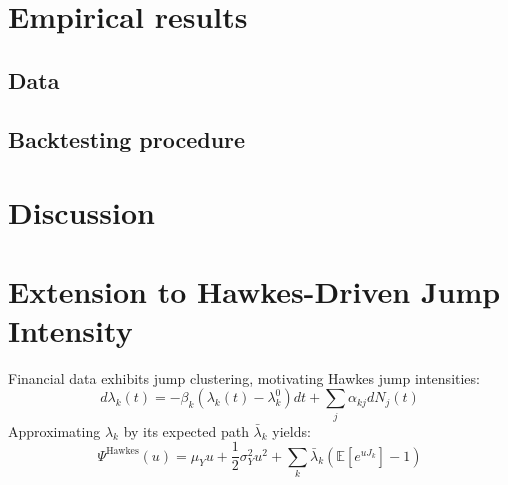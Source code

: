 \documentclass{article} %
\theoremstyle{plain}
\theoremstyle{definition} %
\begin{document}
\section{Empirical results}
\subsection{Data}
\subsection{Backtesting procedure}

\section{Discussion}


\section{Extension to Hawkes-Driven Jump Intensity}
Financial data exhibits jump clustering, motivating Hawkes jump intensities:
\[
d\lambda_k(t) = -\beta_k(\lambda_k(t)-\lambda_k^0)dt + \sum_j \alpha_{kj}dN_j(t)
\]
Approximating $\lambda_k$ by its expected path $\bar{\lambda}_k$ yields:
\[
\Psi^{\text{Hawkes}}(u) = \mu_Y u + \frac{1}{2}\sigma_Y^2u^2 + \sum_k \bar{\lambda}_k\left(\mathbb{E}[e^{u J_k}]-1\right)
\]

\end{document}
